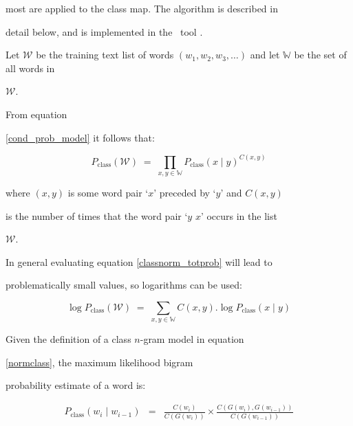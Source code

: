 most are applied to the class map. The algorithm is described in


detail below, and is implemented in the \HTK\ tool .





Let $\mathcal{W}$ be the training text list of words $(w_1, w_2, w_3,


\ldots)$ and let $\mathbb{W}$ be the set of all words in


$\mathcal{W}$.


From equation


\ref{cond_prob_model} it follows that:


\begin{equation}


P_\mathrm{class}(\mathcal{W}) \;=\; \prod_{x, y \in \mathbb{W}}


P_\mathrm{class}(x \;|\; y)^{C(x,y)}\label{classnorm_totprob}


\end{equation}


where $(x, y)$ is some word pair `$x$' preceded by `$y$' and $C(x, y)$


is the number of times that the word pair `$y$ $x$' occurs in the list


$\mathcal{W}$.





In general evaluating equation \ref{classnorm_totprob} will lead to


problematically small values, so logarithms can be used:


\begin{equation}


\log P_\mathrm{class}(\mathcal{W}) \;=\; \sum_{x, y \in \mathbb{W}}


C(x, y) . \log P_\mathrm{class}(x \;|\; y) \label{classnorm_logprob}


\end{equation}





Given the definition of a class $n$-gram model in equation


\ref{normclass}, the maximum likelihood bigram


probability estimate of a word is:


\begin{eqnarray}


P_\mathrm{class}(w_i \;|\; w_{i-1}) & = &


 \frac{C(w_i)}{C(G(w_i))}


  \times


  \frac{C\left(G(w_i), G(w_{i-1})\right)}


       {C(G(w_{i-1}))} \label{classnorm_breakdown}


\end{eqnarray}


